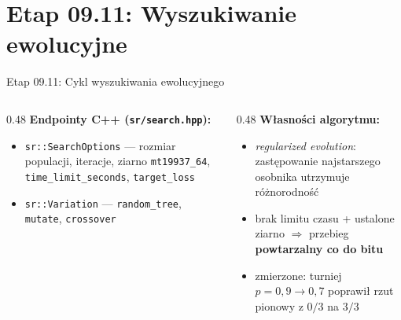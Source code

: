 \documentclass[
  polish,
  aspectratio=169,
]{beamer}
\begin{document}
\section{Etap 09.11: Wyszukiwanie ewolucyjne}
\begin{frame}{Etap 09.11: Cykl wyszukiwania ewolucyjnego}
  \centering
  \medskip
  \begin{columns}[T]
    \begin{column}{0.48\textwidth}
      \textbf{Endpointy C++ (\texttt{sr/search.hpp}):}
      \begin{itemize}\footnotesize
        \item \texttt{sr::SearchOptions} --- rozmiar populacji, iteracje, ziarno \texttt{mt19937\_64}, \texttt{time\_limit\_seconds}, \texttt{target\_loss}
        \item \texttt{sr::Variation} --- \texttt{random\_tree}, \texttt{mutate}, \texttt{crossover}
      \end{itemize}
    \end{column}
    \begin{column}{0.48\textwidth}
      \textbf{Własności algorytmu:}
      \begin{itemize}\footnotesize
        \item \emph{regularized evolution}: zastępowanie najstarszego osobnika utrzymuje różnorodność
        \item brak limitu czasu + ustalone ziarno $\Rightarrow$ przebieg \textbf{powtarzalny co do bitu}
        \item zmierzone: turniej $p=0{,}9 \to 0{,}7$ poprawił rzut pionowy z $0/3$ na $3/3$
      \end{itemize}
    \end{column}
  \end{columns}
\end{frame}
\end{document}
